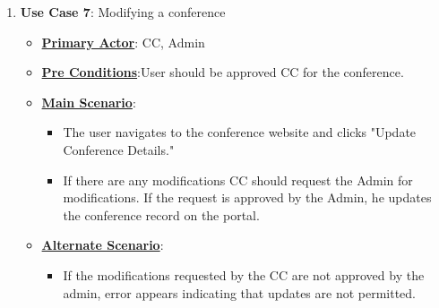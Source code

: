 \documentclass[english,a4paper,12pt]{report}
\begin{document}
\begin{enumerate}
    \item \textbf{Use Case 7}: Modifying a conference
    \begin{itemize}
         \item \underline{\textbf{Primary Actor}}: CC, Admin
        \item \underline{\textbf{Pre Conditions}}:User should be approved CC for the conference.
        \item \underline{\textbf{Main Scenario}}:
        \begin{itemize}
        \item The user navigates to the conference website and clicks "Update Conference Details."
        \item If there are any modifications CC should request the Admin for modifications. If the request is approved by the Admin, he updates the conference record on the portal.
        \end{itemize}
        \item \underline{\textbf{Alternate Scenario}}:
        \begin{itemize}
        \item If the modifications requested by the CC are not approved by the admin, error appears indicating that updates are not permitted.
        
        \end{itemize}
        
    \end{itemize}
    
  
\end{enumerate}
\end{document}
